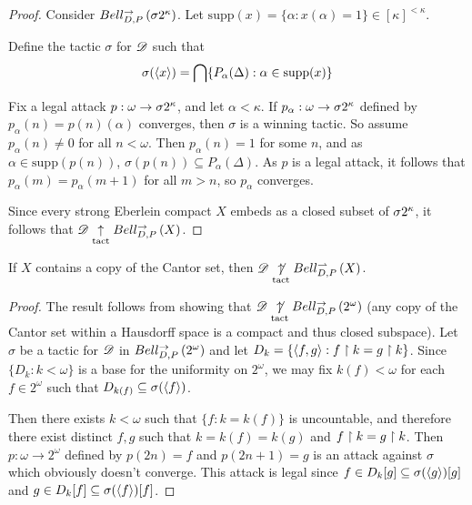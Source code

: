\documentclass[11pt]{article}
\begin{document}
  \begin{proof}
    Consider $Bell_{D,P}^{\to}\left({\sigma2^{\kappa}}\right)$. Let
    $\text{supp}(x)=\{\alpha:x(\alpha)=1\}\in[\kappa]^{<\kappa}$.

    Define the tactic $\sigma$ for $\mathscr{D}$ such that
      \[
        \sigma(\langle x\rangle)
          =
        \bigcap\{
          P_\alpha(\Delta) : \alpha\in\text{supp}(x)
        \}
      \]

    Fix a legal attack $p:\omega\to\sigma2^{\kappa}$, and let
    $\alpha<\kappa$. If $p_\alpha:\omega\to\sigma2^{\kappa}$ defined by
    $p_\alpha(n)=p(n)(\alpha)$ converges, then $\sigma$ is a winning
    tactic. So assume $p_\alpha(n)\not=0$ for all $n<\omega$.
    Then $p_\alpha(n)=1$ for some $n$, and as $\alpha\in\text{supp}(p(n))$,
    $\sigma(p(n))\subseteq P_\alpha(\Delta)$. As $p$ is a legal attack,
    it follows that $p_\alpha(m)=p_\alpha(m+1)$ for all $m>n$, so
    $p_\alpha$ converges.

    Since every strong Eberlein compact $X$ embeds as a closed subset of
    $\sigma2^{\kappa}$, it follows that $\mathscr{D}\underset{\text{tact}}{\uparrow}Bell_{D,P}^{\to}\left({X}\right)$.
  \end{proof}

  \begin{theorem}\label{cantorCopy}
    If $X$ contains a copy of the Cantor set, then
    $\mathscr{D}\underset{\text{tact}}{\not\uparrow}Bell_{D,P}^{\rightharpoonup}\left({X}\right)$.
  \end{theorem}

  \begin{proof}
    The result follows from showing that
    $\mathscr{D}\underset{\text{tact}}{\not\uparrow}Bell_{D,P}^{\to}\left({2^\omega}\right)$ (any copy of the Cantor
    set within a Hausdorff space is a compact and thus closed subspace).
    Let $\sigma$ be a tactic for $\mathscr{D}$ in $Bell_{D,P}^{\to}\left({2^\omega}\right)$
    and let $D_k=\{\langle f,g\rangle:f\restriction k = g\restriction k\}$. Since $\{D_k:k<\omega\}$
    is a base for the uniformity on $2^\omega$, we may fix $k(f)<\omega$
    for each $f\in2^\omega$ such that $D_{k(f)}\subseteq\sigma(\langle f\rangle)$.

    Then there exists $k<\omega$ such that $\{f:k=k(f)\}$ is uncountable,
    and therefore there exist distinct $f,g$ such that $k=k(f)=k(g)$ and
    $f\restriction k=g\restriction k$. Then $p:\omega\to2^\omega$ defined by
    $p(2n)=f$ and $p(2n+1)=g$ is an attack against $\sigma$ which
    obviously doesn't converge. This attack is legal since
    $f\in D_k[g]\subseteq\sigma(\langle g\rangle)[g]$ and
    $g\in D_k[f]\subseteq\sigma(\langle f\rangle)[f]$.
  \end{proof}
\end{document}
